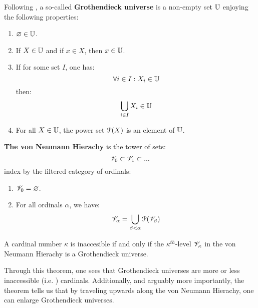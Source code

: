             \begin{definition} \label{def: grothendieck_universes} 
                Following \cite[Expos\'e I, Section 0]{sga4}, a so-called \textbf{Grothendieck universe} is a non-empty set $\mathbb{U}$ enjoying the following properties:
                    \begin{enumerate}
                        \item $\varnothing \in \mathbb{U}$.
                        \item If $X \in \mathbb{U}$ and if $x \in X$, then $x \in \mathbb{U}$.
                        \item If for some set $I$, one has:
                            $$\forall i \in I: X_i \in \mathbb{U}$$
                        then:
                            $$\bigcup_{i \in I} X_i \in \mathbb{U}$$
                        \item For all $X \in \mathbb{U}$, the power set $\mathcal{P}(X)$ is an element of $\mathbb{U}$.
                    \end{enumerate}
            \end{definition}
            \begin{definition} \label{def: von_neumann_hierachy}
                \textbf{The von Neumann Hierachy} is the tower of sets:
                    $$\mathscr{V}_0 \subset \mathscr{V}_1 \subset ...$$
                index by the filtered category of ordinals:
                    \begin{enumerate}
                        \item $\mathscr{V}_0 = \varnothing$. 
                        \item For all ordinals $\alpha$, we have:
                            $$\mathscr{V}_{\alpha} = \bigcup_{\beta < \alpha} \mathcal{P}(\mathscr{V}_{\beta})$$
                    \end{enumerate}
            \end{definition}
            \begin{theorem} \label{theorem: universe_enlargement}
                A cardinal number $\kappa$ is inaccesible if and only if the $\kappa^{th}$-level $\mathscr{V}_{\kappa}$ in the von Neumann Hierachy is a Grothendieck universe. 
            \end{theorem}
            \begin{corollary}
                Through this theorem, one sees that Grothendieck universes are more or less inaccessible (i.e. ) cardinals. Additionally, and arguably more importantly, the theorem tells us that by traveling upwards along the von Neumann Hierachy, one can enlarge Grothendieck universes.
            \end{corollary}
            
